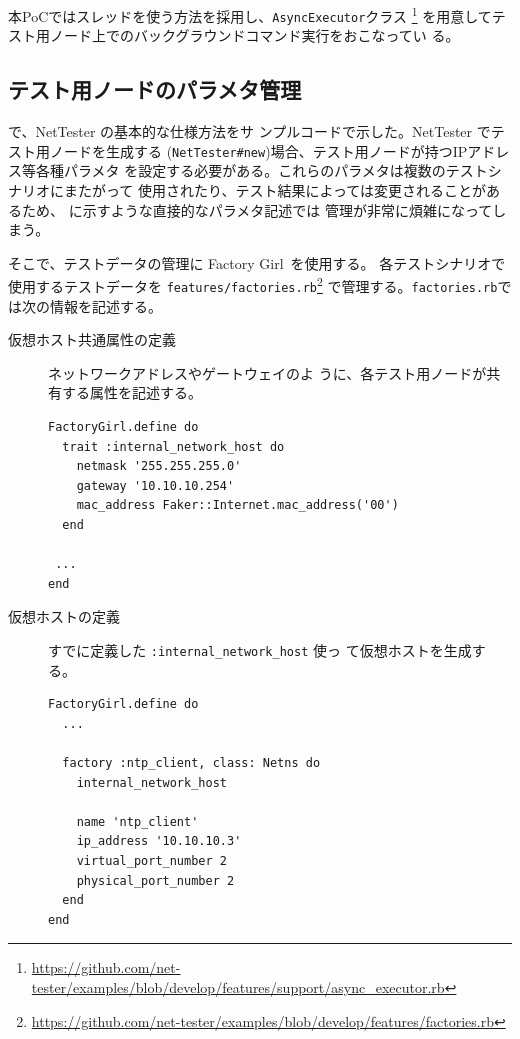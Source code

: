本PoCではスレッドを使う方法を採用し、\verb|AsyncExecutor|クラス
\footnote{\url{https://github.com/net-tester/examples/blob/develop/features/support/async_executor.rb}}
を用意してテスト用ノード上でのバックグラウンドコマンド実行をおこなってい
る。

  \subsection{テスト用ノードのパラメタ管理}
  \label{sec:test-parameter-management}

で、NetTester の基本的な仕様方法をサ
ンプルコードで示した。NetTester でテスト用ノードを生成する
(\verb|NetTester#new|)場合、テスト用ノードが持つIPアドレス等各種パラメタ
を設定する必要がある。これらのパラメタは複数のテストシナリオにまたがって
使用されたり、テスト結果によっては変更されることがあるため、
に示すような直接的なパラメタ記述では
管理が非常に煩雑になってしまう。

そこで、テストデータの管理に Factory Girl~\cite{factory-girl}を使用する。
各テストシナリオで使用するテストデータを
\verb|features/factories.rb|\footnote{\url{https://github.com/net-tester/examples/blob/develop/features/factories.rb}}
で管理する。\verb|factories.rb|では次の情報を記述する。
\begin{description}
 \item[仮想ホスト共通属性の定義] ネットワークアドレスやゲートウェイのよ
            うに、各テスト用ノードが共有する属性を記述する。
\begin{lstlisting}
FactoryGirl.define do
  trait :internal_network_host do
    netmask '255.255.255.0'
    gateway '10.10.10.254'
    mac_address Faker::Internet.mac_address('00')
  end

 ...
end
\end{lstlisting}
 \item[仮想ホストの定義] すでに定義した \verb|:internal_network_host| 使っ
            て仮想ホストを生成する。
\begin{lstlisting}
FactoryGirl.define do
  ...

  factory :ntp_client, class: Netns do
    internal_network_host

    name 'ntp_client'
    ip_address '10.10.10.3'
    virtual_port_number 2
    physical_port_number 2
  end
end
\end{lstlisting}
\end{description}

